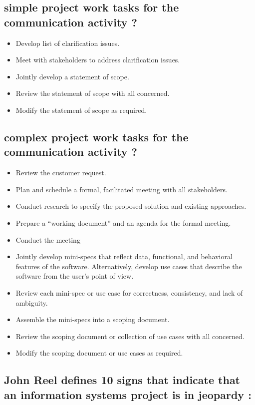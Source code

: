 \documentclass[12pt]{article}
\begin{document}
\subsection{simple project work tasks for the communication activity ?}

\begin{itemize}
	\item Develop list of clarification issues.
	\item Meet with stakeholders to address clarification issues.
	\item Jointly develop a statement of scope.
	\item Review the statement of scope with all concerned.
	\item Modify the statement of scope as required.
\end{itemize}




\subsection{complex project work tasks for the communication activity ?}

\begin{itemize}
	\item Review the customer request.
	\item Plan and schedule a formal, facilitated meeting with all stakeholders.
	\item Conduct research to specify the proposed solution and existing approaches.
	\item Prepare a “working document” and an agenda for the formal meeting.
	\item Conduct the meeting
	\item Jointly develop mini-specs that reflect data, functional, and behavioral
features of the software. Alternatively, develop use cases that describe the
software from the user’s point of view.
	\item Review each mini-spec or use case for correctness, consistency, and lack of
ambiguity.
	\item Assemble the mini-specs into a scoping document.
	\item Review the scoping document or collection of use cases with all
concerned.
	\item Modify the scoping document or use cases as required.
\end{itemize}


\newpage

\subsection{John Reel defines 10 signs that indicate that an information systems
project is in jeopardy :}
\end{document}
